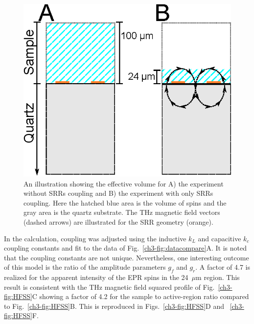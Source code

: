 \begin{figure}[h]\centering
  \includegraphics{Kapitel/Ch3-Images/Ch4-SampleVisualization.eps}%
  \caption[Illustration of the excited sample volumes.]{An illustration showing the effective volume for A) the experiment without SRRs coupling and B) the experiment with only SRRs coupling. Here the hatched blue area is the volume of spins and the gray area is the quartz substrate. The THz magnetic field vectors (dashed arrows) are illustrated for the SRR geometry (orange).
  \label{ch3-fig:effetachi}}
\end{figure}

In the calculation, coupling was adjusted using the inductive $k_L$ and capacitive $k_c$ coupling constants and fit to the data of Fig.~\ref{ch3-fig:datacompare}A. It is noted that the coupling constants are not unique. Nevertheless, one interesting outcome of this model is the ratio of the amplitude parameters $g_f$ and $g_r$. A factor of 4.7 is realized for the apparent intensity of the EPR spins in the 24~$\mu$m region. This result is consistent with the THz magnetic field squared profile of Fig.~\ref{ch3-fig:HFSS}C showing a factor of 4.2 for the sample to active-region ratio compared to Fig.~\ref{ch3-fig:HFSS}B. This is reproduced in Figs.~\ref{ch3-fig:HFSS}D and ~\ref{ch3-fig:HFSS}F.

